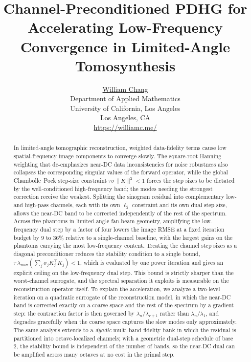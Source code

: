 \documentclass{article}
\title{Channel-Preconditioned PDHG for Accelerating Low-Frequency Convergence in Limited-Angle Tomosynthesis}
\date{}
\author{ \href{https://orcid.org/0000-0003-1700-756X}{William Chang} \\
	Department of Applied Mathematics\\
	University of California, Los Angeles\\
	Los Angeles, CA \\
	\url{https://williamc.me/}
}
\begin{document}
\maketitle

\begin{abstract}
In limited-angle tomographic reconstruction, weighted data-fidelity terms cause low spatial-frequency image components to converge slowly. The square-root Hanning weighting that de-emphasizes near-DC data inconsistencies for noise robustness also collapses the corresponding singular values of the forward operator, while the global Chambolle--Pock step-size constraint $\tau\sigma\|K\|^2<1$ forces the step sizes to be dictated by the well-conditioned high-frequency band; the modes needing the strongest correction receive the weakest. Splitting the sinogram residual into complementary low- and high-pass channels, each with its own $\ell_2$ constraint and its own dual step size, allows the near-DC band to be corrected independently of the rest of the spectrum. Across five phantoms in limited-angle fan-beam geometry, amplifying the low-frequency dual step by a factor of four lowers the image RMSE at a fixed iteration budget by $9$ to $36\%$ relative to a single-channel baseline, with the largest gains on the phantoms carrying the most low-frequency content. Treating the channel step sizes as a diagonal preconditioner reduces the stability condition to a single bound, $\tau\,\lambda_{\max}(\sum_j\sigma_jK_j^\top K_j)<1$, which is evaluated by one power iteration and gives an explicit ceiling on the low-frequency dual step. This bound is strictly sharper than the worst-channel surrogate, and the spectral separation it exploits is measurable on the reconstruction operator itself. To explain the acceleration, we analyze a two-level iteration on a quadratic surrogate of the reconstruction model, in which the near-DC band is corrected exactly on a coarse space and the rest of the spectrum by a gradient step: the contraction factor is then governed by $\lambda_n/\lambda_{r+1}$ rather than $\lambda_n/\lambda_1$, and degrades gracefully when the coarse space captures the slow modes only approximately. The same analysis extends to a \emph{dyadic} multi-band fidelity bank in which the residual is partitioned into octave-localized channels; with a geometric dual-step schedule of base $2$, the stability bound is independent of the number of bands, so the near-DC dual can be amplified across many octaves at no cost in the primal step.
\end{abstract}
\end{document}
